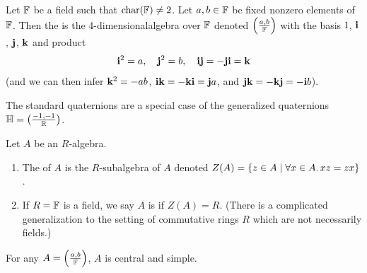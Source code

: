 \begin{definition}
Let $\mathbb{F}$ be a field such that $\operatorname{char}(\mathbb{F})\neq2$. Let $a,b\in\mathbb{F}$ be
fixed nonzero elements of $\mathbb{F}$. Then the 
is the 4-dimensionalalgebra over $\mathbb{F}$ denoted $\left(\frac{a,b}{\mathbb{F}}\right)$
with the basis $1$, $\mathbf{i}$, $\mathbf{j}$, $\mathbf{k}$ and product
\begin{equation}
\mathbf{i}^{2}=a,\quad\mathbf{j}^{2}=b,\quad\mathbf{i}\mathbf{j}=-\mathbf{j}\mathbf{i}=\mathbf{k}
\end{equation}
(and we can then infer $\mathbf{k}^{2}=-ab$, $\mathbf{i}\mathbf{k}=-\mathbf{k}\mathbf{i}=\mathbf{j}a$, and $\mathbf{j}\mathbf{k}=-\mathbf{k}\mathbf{j}=-\mathbf{i}b$).
\end{definition}

\begin{example}
The standard quaternions are a special case of the generalized
quaternions $\mathbb{H}=\left(\frac{-1,-1}{\mathbb{R}}\right)$.
\end{example}

\begin{definition}
Let $A$ be an $R$-algebra. 
\begin{enumerate}
\item The  of $A$ is the $R$-subalgebra of $A$ denoted
  $Z(A)=\{z\in A\mid\forall x\in A\ldotp xz=zx\}$.
\item If $R=\mathbb{F}$ is a field, we say $A$ is  if $Z(A)=R$.
  (There is a complicated generalization to the setting of commutative
  rings $R$ which are not necessarily fields.)
\end{enumerate}
\end{definition}

\begin{lemma}\label{lemma:1.10}
For any $A=\left(\frac{a,b}{\mathbb{F}}\right)$, $A$ is central and simple.
\end{lemma}

